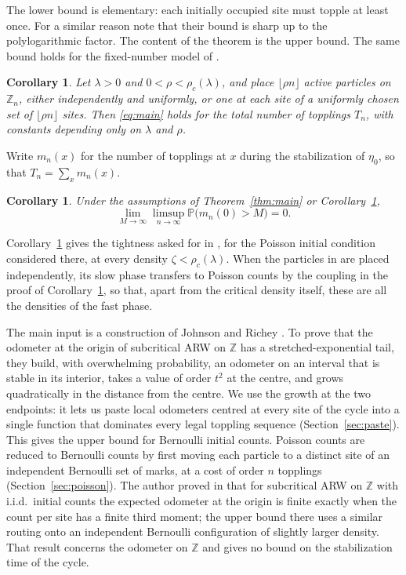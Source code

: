 \documentclass[11pt]{amsart}
\newtheorem{corollary}[theorem]{Corollary}
\theoremstyle{remark}
\newcommand{\Z}{\mathbb Z}
\renewcommand{\Pr}{\mathbb P}
\begin{document}
The lower bound is elementary: each initially occupied site must topple at least once. For a similar
reason \cite{BGHR} note that their bound is sharp up to the polylogarithmic factor. The content of the theorem is the upper bound. The same bound holds for the fixed-number model of \cite[Proposition~8.12]{HJJ}.

\begin{corollary}\label{cor:fixed}
Let $\lambda>0$ and $0<\rho<\rho_c(\lambda)$, and place $\lfloor\rho n\rfloor$ active particles on $\Z_n$, either
independently and uniformly, or one at each site of a uniformly chosen set of $\lfloor\rho n\rfloor$ sites. Then \eqref{eq:main} holds for the total number of topplings $T_n$, with constants depending only
on $\lambda$ and $\rho$.
\end{corollary}

Write $m_n(x)$ for the number of topplings at $x$ during the stabilization of $\eta_0$, so that $T_n=\sum_x m_n(x)$.

\begin{corollary}\label{cor:tight}
Under the assumptions of Theorem~\ref{thm:main} or Corollary~\ref{cor:fixed},
\[
\lim_{M\to\infty}\limsup_{n\to\infty}\Pr\bigl(m_n(0)>M\bigr)=0 .
\]
\end{corollary}

Corollary~\ref{cor:tight} gives the tightness asked for in \cite[Section~6]{Rolla}, for the Poisson initial condition
considered there, at every density $\zeta<\rho_c(\lambda)$. When the particles in \cite[Proposition~8.12]{HJJ} are
placed independently, its slow phase transfers to Poisson counts by the coupling in the proof of Corollary~\ref{cor:fixed}, so that, apart from the critical density
itself, these are all the densities of the fast phase.

The main input is a construction of Johnson and Richey \cite{JR}. To prove that the odometer at the origin of
subcritical ARW on $\Z$ has a stretched-exponential tail, they build, with overwhelming probability, an odometer on an
interval that is stable in its interior, takes a value of order $t^2$ at the centre, and grows quadratically in the
distance from the centre. We use the growth at the two endpoints: it lets us paste local odometers centred at every site
of the cycle into a single function that dominates every legal toppling sequence (Section~\ref{sec:paste}). This gives
the upper bound for Bernoulli initial counts. Poisson counts are reduced to Bernoulli counts by first moving each
particle to a distinct site of an independent Bernoulli set of marks, at a cost of order $n$ topplings
(Section~\ref{sec:poisson}). The author proved in \cite{Shm} that for subcritical ARW on $\Z$
with i.i.d.\ initial counts the expected odometer at the origin is finite exactly when the count per site has a finite
third moment; the upper bound there uses a similar routing onto an independent Bernoulli configuration of slightly
larger density. That result concerns the odometer on $\Z$ and gives no bound on the stabilization time of the cycle.
\end{document}
